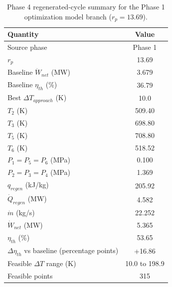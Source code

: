 \begin{table}[htbp]
    \centering
    \caption{Phase 4 regenerated-cycle summary for the Phase 1 optimization model branch ($r_p = 13.69$).}
    \label{tab:phase4_summary_phase1_optimization}
    \begin{tabular}{lc}
        \hline
        Quantity & Value \\
        \hline
        Source phase & Phase 1 \\
        $r_p$ & 13.69 \\
        Baseline $\dot{W}_{net}$ (MW) & 3.679 \\
        Baseline $\eta_{th}$ (\%) & 36.79 \\
        Best $\Delta T_{approach}$ (K) & 10.0 \\
        $T_2$ (K) & 509.40 \\
        $T_3$ (K) & 698.80 \\
        $T_5$ (K) & 708.80 \\
        $T_6$ (K) & 518.52 \\
        $P_1=P_5=P_6$ (MPa) & 0.100 \\
        $P_2=P_3=P_4$ (MPa) & 1.369 \\
        $q_{regen}$ (kJ/kg) & 205.92 \\
        $\dot{Q}_{regen}$ (MW) & 4.582 \\
        $\dot{m}$ (kg/s) & 22.252 \\
        $\dot{W}_{net}$ (MW) & 5.365 \\
        $\eta_{th}$ (\%) & 53.65 \\
        $\Delta\eta_{th}$ vs baseline (percentage points) & +16.86 \\
        Feasible $\Delta T$ range (K) & 10.0 to 198.9 \\
        Feasible points & 315 \\
        \hline
    \end{tabular}
\end{table}